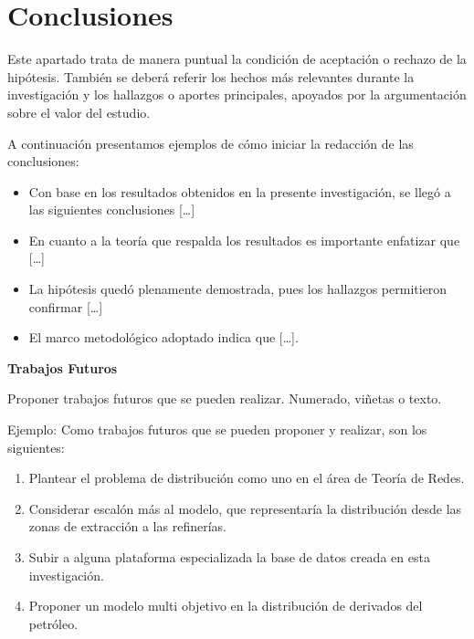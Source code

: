 \chapter*{Conclusiones}

\noindent \textcolor[rgb]{0,0,1}{
	Este apartado trata de manera puntual la condición de aceptación o rechazo de la hipótesis. También se deberá referir los hechos más relevantes durante la investigación y los hallazgos o aportes principales, apoyados por la argumentación sobre el valor del estudio.}

\noindent \textcolor[rgb]{0,0,1}{
	A continuación presentamos ejemplos de cómo iniciar la redacción de las conclusiones:
	\begin{itemize}
		\item Con base en los resultados obtenidos en la presente investigación, se llegó a las siguientes conclusiones [\ldots]
		\item En cuanto a la teoría que respalda los resultados es importante enfatizar que [\ldots]
		\item La hipótesis quedó plenamente demostrada, pues los hallazgos permitieron confirmar [\ldots]
		\item El marco metodológico adoptado indica que [\ldots].
	\end{itemize}
}



\noindent \textbf{Trabajos Futuros}

\noindent \textcolor[rgb]{0,0,1}{
	Proponer trabajos futuros que se pueden realizar. Numerado, viñetas o texto.}

\noindent \textcolor[rgb]{0,0,1}{
	Ejemplo:\newline
	Como trabajos futuros que se pueden proponer y realizar, son los siguientes: 
	\begin{enumerate}
		\item Plantear el problema de distribución como uno en el área de Teoría de Redes.
		\item Considerar escalón más al modelo, que representaría la distribución desde las zonas de extracción a las refinerías.
		\item Subir a alguna plataforma especializada la base de datos creada en esta investigación.
		\item Proponer un modelo multi objetivo en la distribución de derivados del petróleo.
	\end{enumerate}
}


